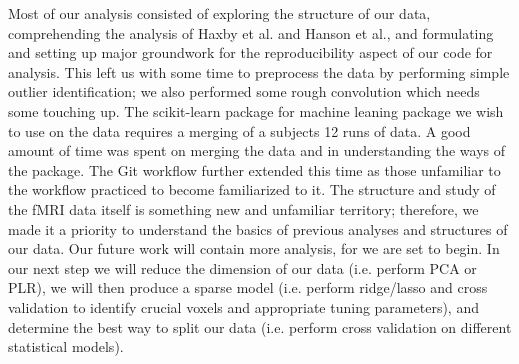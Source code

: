 \documentclass[11pt]{article}
\begin{document}
Most of our analysis consisted of exploring the structure of our data, 
comprehending the analysis of Haxby et al. and Hanson et al., and formulating 
and setting up major groundwork for the reproducibility aspect of our code for 
analysis. This left us with some time to preprocess the data by performing 
simple outlier identification; we also performed some rough convolution which 
needs some touching up. The scikit-learn package for machine leaning package we 
wish to use on the data requires a merging of a subjects 12 runs of data.  A 
good amount of time was spent on merging the data and in understanding the ways 
of the package.  The Git workflow further extended this time as those 
unfamiliar to the workflow practiced to become familiarized to it.  The 
structure and study of the fMRI data itself is something new and unfamiliar 
territory; therefore, we made it a priority to understand the basics of 
previous analyses and structures of our data.  Our future work will contain 
more analysis, for we are set to begin. In our next step we will reduce the 
dimension of our data (i.e. perform PCA or PLR), we will then produce a sparse 
model (i.e. perform ridge/lasso and cross validation to identify crucial voxels 
and appropriate tuning parameters), and determine the best way to split our 
data (i.e. perform cross validation on different statistical models). 



\end{document}
